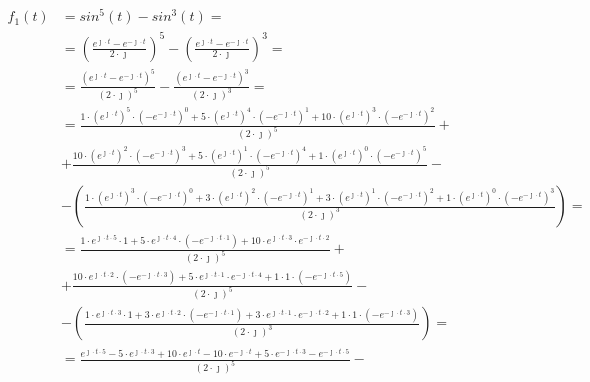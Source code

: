 \begin{task}
\begin{align*}
f_{1}(t)&=sin^5(t)-sin^3(t)= \\
&=\left( \frac{e^{\jmath \cdot t} - e^{-\jmath \cdot t}}{2 \cdot \jmath} \right)^5 - \left( \frac{e^{\jmath \cdot t} - e^{-\jmath \cdot t}}{2 \cdot \jmath} \right)^3= \\
&=\frac{\left(e^{\jmath \cdot t} - e^{-\jmath \cdot t}\right)^5}{\left(2 \cdot \jmath\right)^5}-\frac{\left(e^{\jmath \cdot t} - e^{-\jmath \cdot t}\right)^3}{\left(2 \cdot \jmath\right)^3}=\\
&=\frac{1 \cdot (e^{\jmath \cdot t})^5 \cdot (-e^{-\jmath \cdot t})^0 + 5 \cdot (e^{\jmath \cdot t})^4 \cdot (-e^{-\jmath \cdot t})^1 + 10 \cdot (e^{\jmath \cdot t})^3 \cdot (-e^{-\jmath \cdot t})^2}{\left(2 \cdot \jmath\right)^5} + \\
&+\frac{10 \cdot (e^{\jmath \cdot t})^2 \cdot (-e^{-\jmath \cdot t})^3 + 5 \cdot (e^{\jmath \cdot t})^1 \cdot (-e^{-\jmath \cdot t})^4 +1 \cdot (e^{\jmath \cdot t})^0 \cdot (-e^{-\jmath \cdot t})^5}{\left(2 \cdot \jmath\right)^5} - \\
&-\left(\frac{1 \cdot (e^{\jmath \cdot t})^3 \cdot (-e^{-\jmath \cdot t})^0 + 3 \cdot (e^{\jmath \cdot t})^2 \cdot (-e^{-\jmath \cdot t})^1 + 3 \cdot (e^{\jmath \cdot t})^1 \cdot (-e^{-\jmath \cdot t})^2+1 \cdot (e^{\jmath \cdot t})^0 \cdot (-e^{-\jmath \cdot t})^3}{\left(2 \cdot \jmath\right)^3}\right)=\\
&=\frac{1 \cdot e^{\jmath \cdot t \cdot 5} \cdot 1 + 5 \cdot e^{\jmath \cdot t \cdot 4} \cdot (-e^{-\jmath \cdot t \cdot 1}) + 10 \cdot e^{\jmath \cdot t \cdot 3} \cdot e^{-\jmath \cdot t \cdot 2}}{\left(2 \cdot \jmath\right)^5} + \\
&+\frac{10 \cdot e^{\jmath \cdot t \cdot 2} \cdot (-e^{-\jmath \cdot t \cdot 3}) + 5 \cdot e^{\jmath \cdot t \cdot 1} \cdot e^{-\jmath \cdot t \cdot 4} + 1 \cdot 1 \cdot (-e^{-\jmath \cdot t \cdot 5})}{\left(2 \cdot \jmath\right)^5} - \\
&-\left(\frac{1 \cdot e^{\jmath \cdot t \cdot 3} \cdot 1 + 3 \cdot e^{\jmath \cdot t \cdot 2} \cdot (-e^{-\jmath \cdot t \cdot 1}) + 3 \cdot e^{\jmath \cdot t \cdot 1} \cdot e^{-\jmath \cdot t \cdot 2} + 1 \cdot 1 \cdot (-e^{-\jmath \cdot t \cdot 3})}{\left(2 \cdot \jmath\right)^3}\right)=\\
&=\frac{e^{\jmath \cdot t \cdot 5} - 5 \cdot e^{\jmath \cdot t \cdot 3}  + 10 \cdot e^{\jmath \cdot t} - 10 \cdot e^{-\jmath \cdot t} + 5 \cdot e^{-\jmath \cdot t \cdot 3} - e^{-\jmath \cdot t \cdot 5}}{\left(2 \cdot \jmath\right)^5} - \\

\end{align*}
\end{task}
